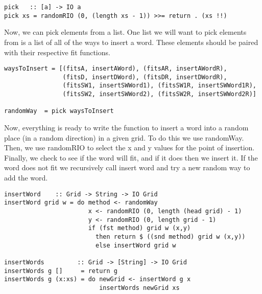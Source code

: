 \documentclass[12pt]{report}   %
\begin{document}
    \vspace{12pt}

    \begin{lstlisting}
pick   :: [a] -> IO a
pick xs = randomRIO (0, (length xs - 1)) >>= return . (xs !!)
    \end{lstlisting}

    \vspace{12pt}

    Now, we can pick elements from a list. One list we will want to pick
    elements from is a list of all of the ways to insert a word. These
    elements should be paired with their respective fit functions.

    \vspace{12pt}

    \begin{lstlisting}
waysToInsert = [(fitsA, insertAWord), (fitsAR, insertAWordR),
                (fitsD, insertDWord), (fitsDR, insertDWordR),
                (fitsSW1, insertSWWord1), (fitsSW1R, insertSWWord1R),
                (fitsSW2, insertSWWord2), (fitsSW2R, insertSWWord2R)]

randomWay  = pick waysToInsert
    \end{lstlisting}

    \vspace{12pt}

    Now, everything is ready to write the function to insert a word into a 
    random place (in a random direction) in a given grid. To do this we use
    randomWay. Then, we use randomRIO to select the x and y values for the 
    point of insertion. Finally, we check to see if the word will fit, and if
    it does then we insert it. If the word does not fit we recursively call
    insert word and try a new random way to add the word.

    \vspace{12pt}

    \begin{lstlisting}
insertWord    :: Grid -> String -> IO Grid
insertWord grid w = do method <- randomWay
                       x <- randomRIO (0, length (head grid) - 1)
                       y <- randomRIO (0, length grid - 1)
                       if (fst method) grid w (x,y)
                         then return $ ((snd method) grid w (x,y))
                         else insertWord grid w

insertWords         :: Grid -> [String] -> IO Grid
insertWords g []     = return g
insertWords g (x:xs) = do newGrid <- insertWord g x
                          insertWords newGrid xs
    \end{lstlisting}
\end{document}
